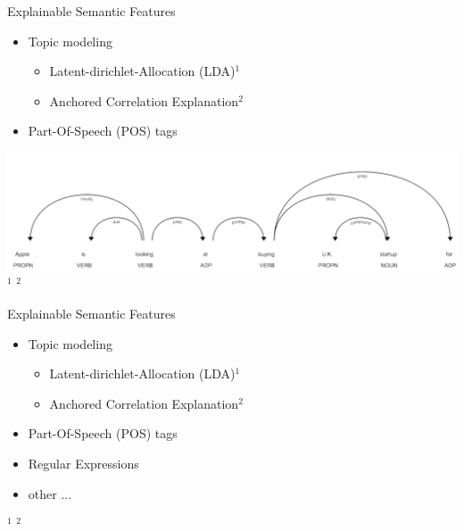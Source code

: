 \documentclass[10pt, compress]{beamer}
\begin{document}
\addtocounter{framenumber}{-1}
\begin{frame}[t]{Explainable Semantic Features}
\begin{itemize}
	\item Topic modeling
	\begin{itemize}
		\item Latent-dirichlet-Allocation (LDA)$^1$
		\item Anchored Correlation Explanation$^2$
	\end{itemize}
	\item Part-Of-Speech (POS) tags
\end{itemize}
{\centering
\vfill
\includegraphics[width=\textwidth]{gfx/POS}
}
\vfill{}
{\tiny
$^1$ \cite{10.5555/944919.944937}
$^2$ \cite{TACL1244}
}
\end{frame}


\addtocounter{framenumber}{-1}
\begin{frame}[t]{Explainable Semantic Features}
\begin{itemize}
	\item Topic modeling
	\begin{itemize}
		\item Latent-dirichlet-Allocation (LDA)$^1$
		\item Anchored Correlation Explanation$^2$
	\end{itemize}
	\item Part-Of-Speech (POS) tags
	\item Regular Expressions
	\item other ...
\end{itemize}
\vfill{}
{\tiny\raggedright
$^1$ \cite{10.5555/944919.944937}
$^2$ \cite{TACL1244}
}
\end{frame}
\end{document}
